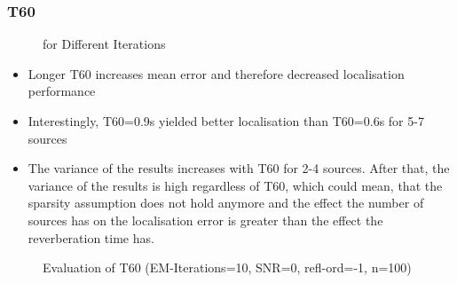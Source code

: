 \subsubsection{T60}
\begin{figure}[H]
    \setlength\figureheight{7cm}
    \small
    \setlength\figurewidth{\textwidth}
	\centering
	\begin{tikzpicture}
	    \footnotesize
	    
	    
	    
	\end{tikzpicture}
	
	\caption{\boxplotDescription for Different  Iterations}
	\label{fig:trial1}
\end{figure}

\begin{itemize}
    \item Longer T60 increases mean error and therefore decreased localisation performance
    \item Interestingly, T60=0.9s yielded better localisation than T60=0.6s for 5-7 sources
    \item The variance of the results increases with T60 for 2-4 sources. After that, the variance of the results is high regardless of T60, which could mean, that the sparsity assumption does not hold anymore and the effect the number of sources has on the localisation error is greater than the effect the reverberation time has.
\end{itemize}

\begin{figure}[H]
    \centering
    \begin{subfigure}{0.49\textwidth}
          \centering
	       
	\end{subfigure}
    \begin{subfigure}{0.49\textwidth}
          \centering
	       
%            
	\end{subfigure}
\caption{Evaluation of T60 (EM-Iterations=10, SNR=0, refl-ord=-1, n=100)}
\end{figure}